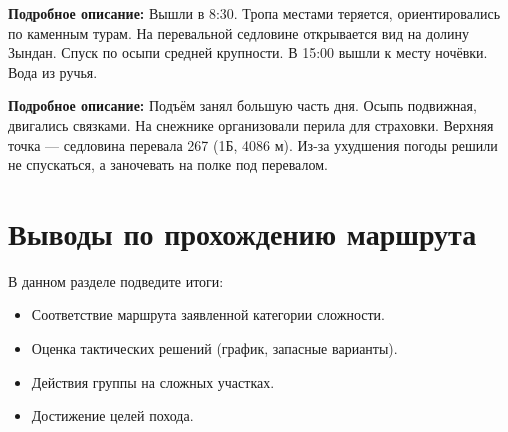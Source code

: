\textbf{Подробное описание:}
Вышли в 8:30. Тропа местами теряется, ориентировались по каменным турам. На перевальной седловине открывается вид на долину Зындан. Спуск по осыпи средней крупности. В 15:00 вышли к месту ночёвки. Вода из ручья.



\begin{tourinfotable}
\end{tourinfotable}

\textbf{Подробное описание:}
Подъём занял большую часть дня. Осыпь подвижная, двигались связками. На снежнике организовали перила для страховки. Верхняя точка — седловина перевала 267 (1Б, 4086 м). Из-за ухудшения погоды решили не спускаться, а заночевать на полке под перевалом.



\section{Выводы по прохождению маршрута}

В данном разделе подведите итоги:
\begin{itemize}
    \item Соответствие маршрута заявленной категории сложности.
    \item Оценка тактических решений (график, запасные варианты).
    \item Действия группы на сложных участках.
    \item Достижение целей похода.
\end{itemize}

